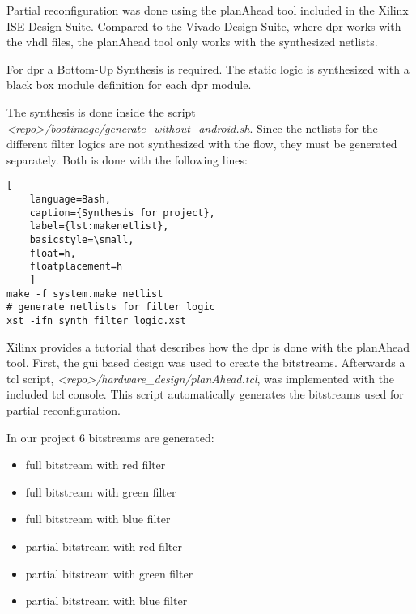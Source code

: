 Partial reconfiguration was done using the planAhead tool included in the Xilinx ISE Design Suite. Compared to the Vivado Design Suite, where \gls{dpr} works with the \gls{vhdl} files, the planAhead tool only works with the synthesized netlists.

For \gls{dpr} a Bottom-Up Synthesis is required. The static logic is synthesized with a black box module definition for each \gls{dpr} module.

The synthesis is done inside the script \emph{<repo>/bootimage/generate\_without\_android.sh}. Since the netlists for the different filter logics are not synthesized with the flow, they must be generated separately. Both is done with the following lines: 

\begin{lstlisting}[
	language=Bash,
	caption={Synthesis for project},
	label={lst:makenetlist},
	basicstyle=\small,
	float=h,
	floatplacement=h
	]
make -f system.make netlist
# generate netlists for filter logic
xst -ifn synth_filter_logic.xst
\end{lstlisting}

Xilinx provides a tutorial \cite{planAheadTutorial} that describes how the \gls{dpr} is done with the planAhead tool. First, the \gls{gui} based design was used to create the bitstreams. Afterwards a \gls{tcl} script, \emph{<repo>/hardware_design/planAhead.tcl}, was implemented with the included \gls{tcl} console. This script automatically generates the bitstreams used for partial reconfiguration. 

In our project $6$ bitstreams are generated:
\begin{itemize}
	\item full bitstream with red filter
	\item full bitstream with green filter
	\item full bitstream with blue filter
	\item partial bitstream with red filter
	\item partial bitstream with green filter
	\item partial bitstream with blue filter
\end{itemize}
